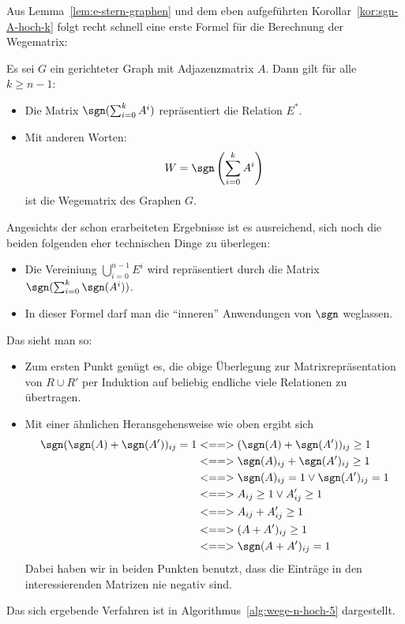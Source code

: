 Aus Lemma~\ref{lem:e-stern-graphen} und dem eben aufgeführten
Korollar~\ref{kor:sgn-A-hoch-k} folgt recht schnell eine erste Formel
für die Berechnung der Wegematrix:
% 
\begin{lemma}
  Es sei $G$ ein gerichteter Graph mit Adjazenzmatrix $A$. Dann gilt
  für alle $k\geq n-1$: 
  \begin{itemize}
  \item Die Matrix $\sgn(\sum_{i=0}^{k} A^i)$ repräsentiert die
    Relation $E^*$.
  \item Mit anderen Worten: 
    \[
    W = \sgn\left(\sum_{i=0}^{k} A^i\right) 
    \]
    ist die Wegematrix des Graphen $G$.
  \end{itemize}
\end{lemma}
% 
\begin{beweis}
  Angesichts der schon erarbeiteten Ergebnisse ist es ausreichend,
  sich noch die beiden folgenden eher technischen Dinge zu überlegen:
  \begin{itemize}
  \item Die Vereiniung $\bigcup_{i=0}^{n-1} E^i$ wird repräsentiert
    durch die Matrix $\sgn(\sum_{i=0}^{k} \sgn(A^i))$.
  \item In dieser Formel darf man die "`inneren"' Anwendungen von
    $\sgn$ weglassen.
  \end{itemize}
  Das sieht man so:
  \begin{itemize}
  \item Zum ersten Punkt genügt es, die obige Überlegung zur
    Matrixrepräsentation von $R\cup R'$ per Induktion auf beliebig
    endliche viele Relationen zu übertragen.
  \item Mit einer ähnlichen Heransgehensweise wie oben ergibt sich
    \begin{align*}
      \sgn(\sgn(A)+\sgn(A'))_{ij} =1 &<==> (\sgn(A)+\sgn(A'))_{ij} \geq 1 \\
      &<==> \sgn(A)_{ij}+\sgn(A')_{ij} \geq 1 \\
      &<==> \sgn(A)_{ij}= 1 \lor \sgn(A')_{ij} = 1 \\
      &<==> A_{ij}\geq 1 \lor A'_{ij} \geq 1 \\
      &<==> A_{ij}+A'_{ij} \geq 1 \\
      &<==> (A+A')_{ij} \geq 1 \\
      &<==> \sgn(A+A')_{ij} = 1
    \end{align*}
    Dabei haben wir in beiden Punkten benutzt, dass die Einträge in
    den interessierenden Matrizen nie negativ sind.
  \end{itemize}
\end{beweis}
%
Das sich ergebende Verfahren ist in
Algorithmus~\ref{alg:wege-n-hoch-5} dargestellt.

